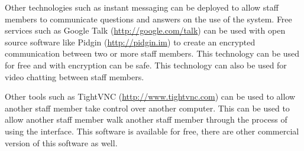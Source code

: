 \documentclass[12pt]{article}
\begin{document}
Other technologies such as instant messaging can be deployed to allow staff
members to communicate questions and answers on the use of the system.
Free services such as Google Talk (\url{http://google.com/talk}) can be 
used with open source software like Pidgin (\url{http://pidgin.im}) to 
create an encrypted communication between two or more staff
members.  This technology can be used for free and with encryption can be
safe.  This technology can also be used for video chatting between staff
members.

Other tools such as TightVNC (\url{http://www.tightvnc.com}) can be used to
allow another staff member take control over another computer.  This can be
used to allow another staff member walk another staff member through the
process of using the interface.  This software is available for free, there
are other commercial version of this software as well.
\end{document}
